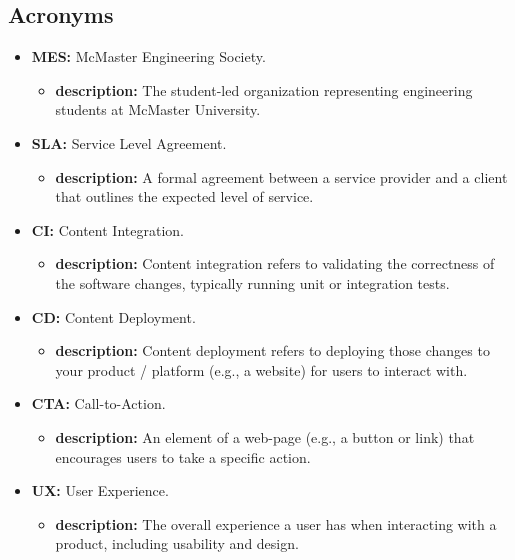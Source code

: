 \documentclass[12pt]{article}
\begin{document}
  \subsection{Acronyms}
    \begin{itemize}
      \item \textbf{MES:} McMaster Engineering Society.
        \begin{itemize}[label=$\circ$]
          \item \textbf{description:} The student-led organization representing engineering students at McMaster University.
        \end{itemize}
      \item \textbf{SLA:} Service Level Agreement.
        \begin{itemize}[label=$\circ$]
          \item \textbf{description:} A formal agreement between a service provider and a client that outlines the expected level of service.
        \end{itemize}
      \item \textbf{CI:} Content Integration.
        \begin{itemize}[label=$\circ$]
          \item \textbf{description:} Content integration refers to validating the correctness of the software changes, typically running unit or integration tests.
        \end{itemize}
      \item \textbf{CD:} Content Deployment.
        \begin{itemize}[label=$\circ$]
          \item \textbf{description:} Content deployment refers to deploying those changes to your product / platform (e.g., a website) for users to interact with.
        \end{itemize}
      \item \textbf{CTA:} Call-to-Action.
        \begin{itemize}[label=$\circ$]
          \item \textbf{description:} An element of a web-page (e.g., a button or link) that encourages users to take a specific action.
        \end{itemize}
      \item \textbf{UX:} User Experience.
        \begin{itemize}[label=$\circ$]
          \item \textbf{description:} The overall experience a user has when interacting with a product, including usability and design.

\end{itemize}
\end{itemize}
\end{document}
